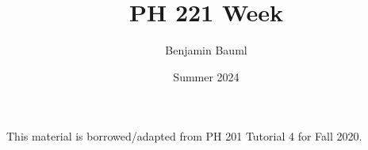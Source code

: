 \documentclass[]{article}
\title{PH 221 Week \Week}
\author{Benjamin Bauml}
\date{Summer 2024}
\newcommand{\FileDepth}{../../..}
\begin{document}
\maketitle
\begin{center}
	This material is borrowed/adapted from PH 201 Tutorial 4 for Fall 2020.
\end{center}




\end{document}
